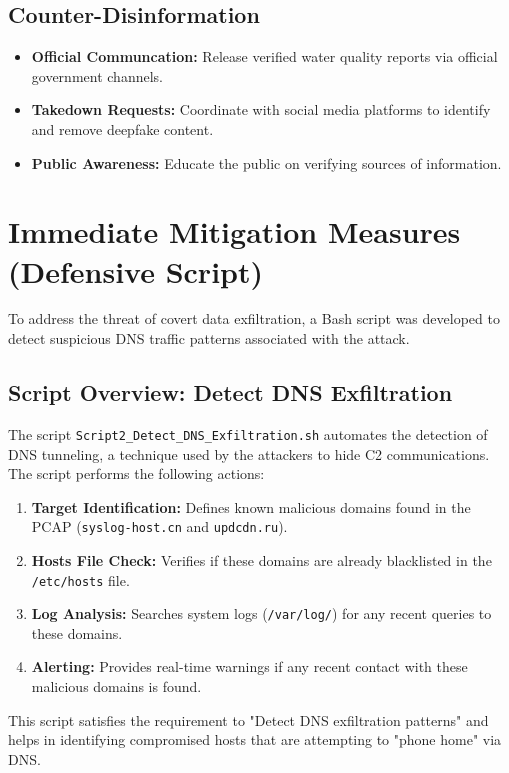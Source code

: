\documentclass[12pt,a4paper]{article}
\begin{document}
\subsection{Counter-Disinformation}
\begin{itemize}
    \item \textbf{Official Communcation:} Release verified water quality reports via official government channels.
    \item \textbf{Takedown Requests:} Coordinate with social media platforms to identify and remove deepfake content.
    \item \textbf{Public Awareness:} Educate the public on verifying sources of information.
\end{itemize}

\section{Immediate Mitigation Measures (Defensive Script)}
To address the threat of covert data exfiltration, a Bash script was developed to detect suspicious DNS traffic patterns associated with the attack.

\subsection{Script Overview: Detect DNS Exfiltration}
The script \texttt{Script2\_Detect\_DNS\_Exfiltration.sh} automates the detection of DNS tunneling, a technique used by the attackers to hide C2 communications. The script performs the following actions:
\begin{enumerate}
    \item \textbf{Target Identification:} Defines known malicious domains found in the PCAP (\texttt{syslog-host.cn} and \texttt{updcdn.ru}).
    \item \textbf{Hosts File Check:} Verifies if these domains are already blacklisted in the \texttt{/etc/hosts} file.
    \item \textbf{Log Analysis:} Searches system logs (\texttt{/var/log/}) for any recent queries to these domains.
    \item \textbf{Alerting:} Provides real-time warnings if any recent contact with these malicious domains is found.
\end{enumerate}

This script satisfies the requirement to "Detect DNS exfiltration patterns" and helps in identifying compromised hosts that are attempting to "phone home" via DNS.
\end{document}
